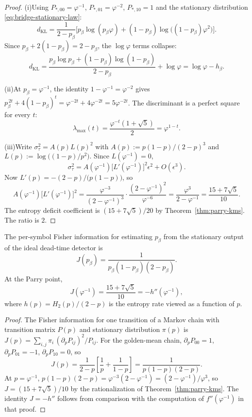 \begin{proof}
(i)\enspace Using $P_{*,00}=\varphi^{-1}$, $P_{*,01}=\varphi^{-2}$, $P_{*,10}=1$ and the stationary distribution \eqref{eq:bridge-stationary-law}:
\[
d_{\mathrm{KL}}
=
\frac{1}{2-p_\beta}
\bigl[
p_\beta\log(p_\beta\varphi)
+
(1-p_\beta)\log\bigl((1-p_\beta)\varphi^2\bigr)
\bigr].
\]
Since $p_\beta+2(1-p_\beta)=2-p_\beta$, the $\log\varphi$ terms collapse:
\[
d_{\mathrm{KL}}
=
\frac{p_\beta\log p_\beta+(1-p_\beta)\log(1-p_\beta)}{2-p_\beta}
+\log\varphi
=
\log\varphi-h_\beta.
\]

(ii)\enspace At $p_\beta=\varphi^{-1}$, the identity $1-\varphi^{-1}=\varphi^{-2}$ gives $p_\beta^{\,2t}+4(1-p_\beta)^t=\varphi^{-2t}+4\varphi^{-2t}=5\varphi^{-2t}$. The discriminant is a perfect square for every $t$:
\[
\lambda_{\max}(t)
=
\frac{\varphi^{-t}(1+\sqrt 5)}{2}
=
\varphi^{1-t}.
\]

(iii)\enspace Write $\sigma_\tau^2=A(p)L(p)^2$ with $A(p):=p(1-p)/(2-p)^3$ and $L(p):=\log\bigl((1-p)/p^2\bigr)$. Since $L(\varphi^{-1})=0$,
\[
\sigma_\tau^2
=
A(\varphi^{-1})\bigl[L'(\varphi^{-1})\bigr]^2\epsilon^2+O(\epsilon^3).
\]
Now $L'(p)=-(2-p)/\bigl(p(1-p)\bigr)$, so
\[
A(\varphi^{-1})\bigl[L'(\varphi^{-1})\bigr]^2
=
\frac{\varphi^{-3}}{(2-\varphi^{-1})^3}\cdot
\frac{(2-\varphi^{-1})^2}{\varphi^{-6}}
=
\frac{\varphi^3}{2-\varphi^{-1}}
=
\frac{15+7\sqrt 5}{10}.
\]
The entropy deficit coefficient is $(15+7\sqrt 5)/20$ by Theorem~\ref{thm:parry-kms}. The ratio is $2$.
\end{proof}

\begin{proposition}\label{prop:fisher}
The per-symbol Fisher information for estimating $p_\beta$ from the stationary output of the ideal dead-time detector is
\begin{equation}\label{eq:fisher-general}
J(p_\beta)
=
\frac{1}{p_\beta(1-p_\beta)(2-p_\beta)}.
\end{equation}
At the Parry point,
\begin{equation}\label{eq:fisher-parry}
J(\varphi^{-1})
=
\frac{15+7\sqrt 5}{10}
=
-h''(\varphi^{-1}),
\end{equation}
where $h(p)=H_2(p)/(2-p)$ is the entropy rate viewed as a function of $p$.
\end{proposition}

\begin{proof}
The Fisher information for one transition of a Markov chain with transition matrix $P(p)$ and stationary distribution $\pi(p)$ is $J(p)=\sum_{i,j}\pi_i\,(\partial_p P_{ij})^2/P_{ij}$. For the golden-mean chain, $\partial_p P_{00}=1$, $\partial_p P_{01}=-1$, $\partial_p P_{10}=0$, so
\[
J(p)
=
\frac{1}{2-p}\left[\frac{1}{p}+\frac{1}{1-p}\right]
=
\frac{1}{p(1-p)(2-p)}.
\]
At $p=\varphi^{-1}$, $p(1-p)(2-p)=\varphi^{-3}(2-\varphi^{-1})=(2-\varphi^{-1})/\varphi^3$, so $J=(15+7\sqrt 5)/10$ by the rationalization of Theorem~\ref{thm:parry-kms}. The identity $J=-h''$ follows from comparison with the computation of $f''(\varphi^{-1})$ in that proof.
\end{proof}

